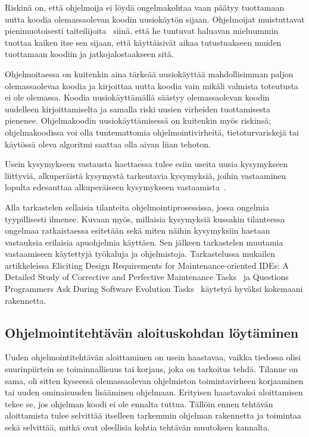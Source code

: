 \documentclass[finnish]{tktltiki2}
\theoremstyle{definition}
\theoremstyle{remark}
\begin{document}
Riskinä on, että ohjelmoija ei löydä ongelmakohtaa vaan päätyy tuottamaan uutta koodia olemassaolevan koodin uusiokäytön sijaan.
Ohjelmoijat muistuttavat pienimuotoisesti taiteilijoita~\cite{hackers-and-painters} siinä, että he tuntuvat haluavan mieluummin tuottaa kaiken itse sen sijaan, että käyttäisivät aikaa tutustuakseen muiden tuottamaan koodiin ja jatkojalostaakseen sitä.

Ohjelmoitaessa on kuitenkin aina tärkeää uusiokäyttää mahdollisimman paljon olemassaolevaa koodia ja kirjoittaa uutta koodia vain mikäli valmista toteutusta ei ole olemassa. Koodia uusiokäyttämällä säästyy olemassaolevan koodin uudelleen kirjoittamiselta ja samalla riski uusien virheiden tuottamisesta pienenee. Ohjelmakoodin uusiokäyttämisessä on kuitenkin myös riskinsä; ohjelmakoodissa voi olla tuntemattomia ohjelmointivirheitä, tietoturvariskejä tai käytössä oleva algoritmi saattaa olla aivan liian tehoton.

Usein kysymykseen vastausta haettaessa tulee esiin useita uusia kysymykseen liittyviä, alkuperäistä kysymystä tarkentavia kysymyksiä, joihin vastaaminen lopulta edesauttaa alkuperäiseen kysymykseen vastaamista~\cite{questions-during-software-evolution-tasks}.

Alla tarkastelen sellaisia tilanteita ohjelmointiprosessissa, jossa ongelmia tyypillisesti ilmenee. Kuvaan myös, millaisia kysymyksiä kussakin tilanteessa ongelmaa ratkaistaessa esitetään sekä miten näihin kysymyksiin haetaan vastauksia erilaisia apuohjelmia käyttäen. Sen jälkeen tarkastelen muutamia vastaamiseen käytettyjä työkaluja ja ohjelmistoja. Tarkastelussa mukailen artikkeleissa Eliciting Design Requirements for Maintenance-oriented IDEs: A Detailed Study of Corrective and Perfective Maintenance Tasks~\cite{eliciting-design-requirements-for-maintenance-oriented-ides} ja Questions Programmers Ask During Software Evolution Tasks~\cite{questions-during-software-evolution-tasks} käytetyä hyväksi kokemaani rakennetta.

\subsection{Ohjelmointitehtävän aloituskohdan löytäminen}

Uuden ohjelmointitehtävän aloittaminen on usein haastavaa, vaikka tiedossa olisi suurinpiirtein se toiminnallisuus tai korjaus, joka on tarkoitus tehdä. Tilanne on sama, oli sitten kyseessä olemassaolevan ohjelmiston toimintavirheen korjaaminen tai uuden ominaisuuden lisääminen ohjelmaan. Erityisen haastavaksi aloittamisen tekee se, jos ohjelman koodi ei ole ennalta tuttua. Tällöin ennen tehtävän aloittamista tulee selvittää itselleen tarkemmin ohjelman rakennetta ja toimintaa sekä selvittää, mitkä ovat oleellisia kohtia tehtävän muutoksen kannalta.
\end{document}
